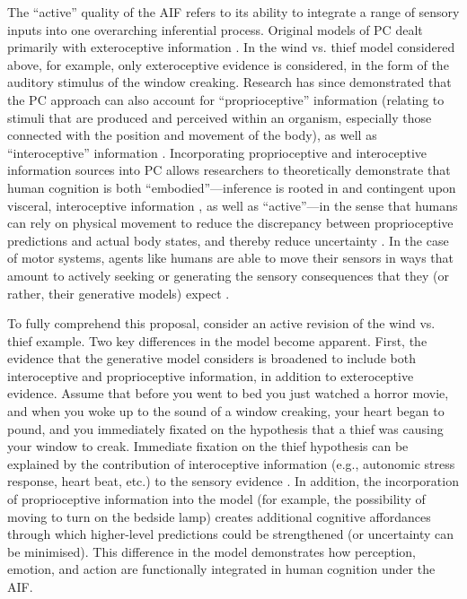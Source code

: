 \begin{CJK}{UTF8}{gbsn}
 The ``active'' quality of the AIF refers to its ability to integrate a range of sensory inputs into one overarching inferential process.  Original models of PC dealt primarily with exteroceptive information \citep[relating to stimuli that are external to an organism, i.e. visual, auditory, haptic perception;][]{Rao1999,Friston2010}.  In the wind vs. thief model considered above, for example, only exteroceptive evidence is considered, in the form of the auditory stimulus of the window creaking.  Research has since demonstrated that the PC approach can also account for ``proprioceptive'' information (relating to stimuli that are produced and perceived within an organism, especially those connected with the position and movement of the body), as well as ``interoceptive'' information  \citep[relating to stimuli produced within an organism, particularly by the body's organs (viscera) e.g., ``gut feelings,'' or elevated heart rate; see][]{Seth2013,FeldmanBarrett2015}.  Incorporating proprioceptive and interoceptive information sources into PC allows researchers to theoretically demonstrate that human cognition is both ``embodied''---inference is rooted in and contingent upon visceral, interoceptive information \citep[][]{Pezzulo2014}, as well as ``active''---in the sense that humans can rely on physical movement to reduce the discrepancy between proprioceptive predictions and actual body states, and thereby reduce uncertainty \citep[see][]{Friston2010,Clark2015}.  In the case of motor systems, agents like humans are able to move their sensors in ways that amount to actively seeking or generating the sensory consequences that they (or rather, their generative models) expect \citep[][1349]{Friston2003}.

To fully comprehend this proposal, consider an active revision of the wind vs. thief example.  Two key differences in the model become apparent.  First, the evidence that the generative model considers is broadened to include both interoceptive and proprioceptive information, in addition to exteroceptive evidence.  Assume that before you went to bed you just watched a horror movie, and when you woke up to the sound of a window creaking, your heart began to pound, and you immediately fixated on the hypothesis that a thief was causing your window to creak.  Immediate fixation on the thief hypothesis can be explained by the contribution of interoceptive information (e.g., autonomic stress response, heart beat, etc.) to the sensory evidence \citep{Pezzulo2014}.  In addition, the incorporation of proprioceptive information into the model (for example, the possibility of moving to turn on the bedside lamp) creates additional cognitive affordances through which higher-level predictions could be strengthened (or uncertainty can be minimised).  This difference in the model demonstrates how perception, emotion, and action are functionally integrated in human cognition under the AIF.


\end{CJK}
